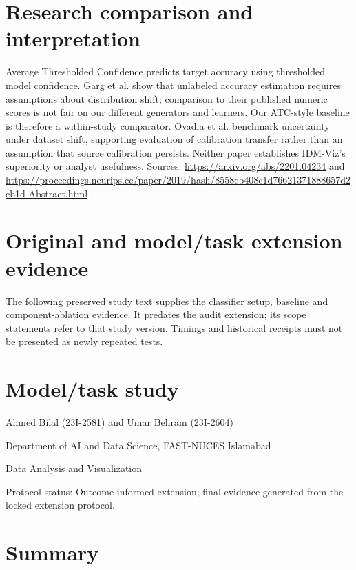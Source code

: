 \documentclass[11pt,a4paper]{article}
\begin{document}
\section{Research comparison and interpretation}

Average Thresholded Confidence predicts target accuracy using thresholded model confidence. Garg et al. show that unlabeled accuracy estimation requires assumptions about distribution shift; comparison to their published numeric scores is not fair on our different generators and learners. Our ATC-style baseline is therefore a within-study comparator. Ovadia et al. benchmark uncertainty under dataset shift, supporting evaluation of calibration transfer rather than an assumption that source calibration persists. Neither paper establishes IDM-Viz's superiority or analyst usefulness. Sources: \url{https://arxiv.org/abs/2201.04234} and \url{https://proceedings.neurips.cc/paper/2019/hash/8558cb408c1d76621371888657d2eb1d-Abstract.html} .\par

\section{Original and model/task extension evidence}

The following preserved study text supplies the classifier setup, baseline and component-ablation evidence. It predates the audit extension; its scope statements refer to that study version. Timings and historical receipts must not be presented as newly repeated tests.\par



\section{Model/task study}


Ahmed Bilal (23I-2581) and Umar Behram (23I-2604)\par
Department of AI and Data Science, FAST-NUCES Islamabad\par
Data Analysis and Visualization\par

Protocol status: Outcome-informed extension; final evidence generated from the locked extension protocol.\par

\section{Summary}
\end{document}
